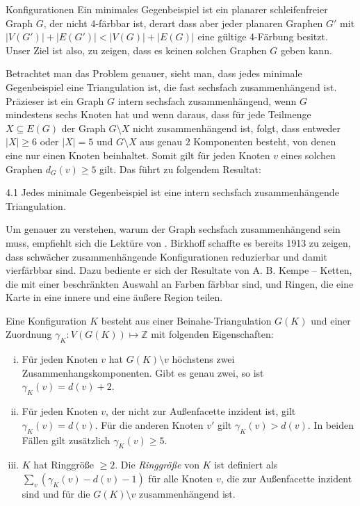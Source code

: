 \begin{section}{Konfigurationen}
 Ein minimales Gegenbeispiel ist ein planarer schleifenfreier Graph $G$, der nicht 4-färbbar ist, derart dass aber jeder planaren Graphen $G'$ mit $|V(G')| + |E(G')| < |V(G)| + |E(G)|$ eine gültige 4-Färbung besitzt. Unser Ziel ist also, zu zeigen, dass es keinen solchen Graphen $G$ geben kann. 
   
   Betrachtet man das Problem genauer, sieht man, dass jedes minimale Gegenbeispiel eine Triangulation ist, die fast sechsfach zusammenhängend ist. Präzieser ist ein Graph $G$ intern sechsfach zusammenhängend, wenn $G$ mindestens sechs Knoten hat und wenn daraus, dass für jede Teilmenge $X \subseteq E(G)$ der Graph $G\setminus X$ nicht zusammenhängend ist, folgt, dass entweder $|X| \geq 6$ oder $|X| = 5$ und $G\setminus X$ aus genau $2$ Komponenten besteht, von denen eine nur einen Knoten beinhaltet. Somit gilt für jeden Knoten $v$ eines solchen Graphen $d_G(v) \geq 5$ gilt. Das führt zu folgendem Resultat:
  
  \begin{satzl}{}{4.1}
   Jedes minimale Gegenbeispiel ist eine intern sechsfach zusammenhängende Triangulation. 
  \end{satzl}

  Um genauer zu verstehen, warum der Graph sechsfach zusammenhängend sein muss, empfiehlt sich die Lektüre von \cite{AmJMath35}. Birkhoff schaffte es bereits 1913 zu zeigen, dass schwächer zusammenhängende Konfigurationen reduzierbar und damit vierfärbbar sind. Dazu bediente er sich der Resultate von A. B. Kempe -- Ketten, die mit einer beschränkten Auswahl an Farben färbbar sind, und Ringen, die eine Karte in eine innere und eine äußere Region teilen. 
  
  \begin{definition}[Konfiguration]
   Eine Konfiguration $K$ besteht aus einer Beinahe-Triangulation $G(K)$ und einer Zuordnung $\gamma_K : V(G(K)) \mapsto \mathbb{Z}$ mit folgenden Eigenschaften:
   \begin{enumerate}[i)]
    \item Für jeden Knoten $v$ hat $G(K) \setminus v$ höchstens zwei Zusammenhangskomponenten. Gibt es genau zwei, so ist $\gamma_K(v) = d(v) + 2$.
    \item Für jeden Knoten $v$, der nicht zur Außenfacette inzident ist, gilt $\gamma_K(v) = d(v)$. Für die anderen Knoten $v'$ gilt $\gamma_K(v) > d(v)$. In beiden Fällen gilt zusätzlich $\gamma_K(v) \geq 5$.
    \item $K$ hat Ringgröße $\geq 2$. Die \textit{Ringgröße} von $K$ ist definiert als $\sum_v (\gamma_K(v) - d(v) - 1)$ für alle Knoten $v$, die zur Außenfacette inzident sind und für die $G(K) \setminus v$ zusammenhängend ist.
   \end{enumerate}
  \end{definition}
   

\end{section}
